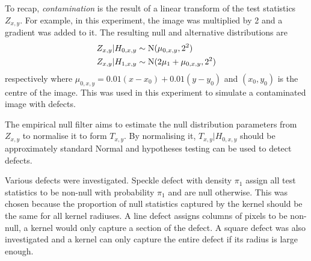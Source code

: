 To recap, \emph{contamination} is the result of a linear transform of the test statistics $Z_{x,y}$. For example, in this experiment, the image was multiplied by 2 and a gradient was added to it. The resulting null and alternative distributions are
\begin{align}
  Z_{x,y}|H_{0,x,y}&\sim\operatorname{N}(\mu_{0,x,y},2^2)
  \\
  Z_{x,y}|H_{1,x,y}&\sim\operatorname{N}(2\mu_1+\mu_{0,x,y},2^2)
\end{align}
respectively where $\mu_{0,x,y}=0.01(x-x_0)+0.01(y-y_0)$ and $(x_0,y_0)$ is the centre of the image. This was used in this experiment to simulate a contaminated image with defects.

The empirical null filter aims to estimate the null distribution parameters from $Z_{x,y}$ to normalise it to form $T_{x,y}$. By normalising it, $T_{x,y}|H_{0,x,y}$ should be approximately standard Normal and hypotheses testing can be used to detect defects.

Various defects were investigated. Speckle defect with density $\pi_1$ assign all test statistics to be non-null with probability $\pi_1$ and are null otherwise. This was chosen because the proportion of null statistics captured by the kernel should be the same for all kernel radiuses. A line defect assigns columns of pixels to be non-null, a kernel would only capture a section of the defect. A square defect was also investigated and a kernel can only capture the entire defect if its radius is large enough.

